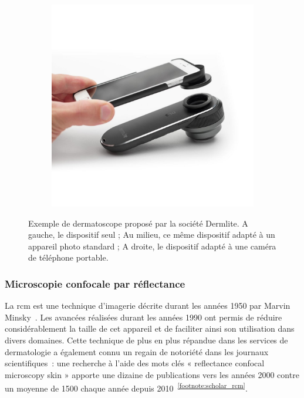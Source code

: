 \begin{figure}[H]
\begin{subfigure}{.32\textwidth}
    \end{subfigure}
    \begin{subfigure}{.32\textwidth}
      \centering
      \includegraphics[width=\linewidth]{contents/chapter_2/resources/example_device_dermlite_3.png}
    \end{subfigure}
    \caption{Exemple de dermatoscope proposé par la société Dermlite. A gauche, le dispositif seul ; Au milieu, ce même dispositif adapté à un appareil photo standard ; A droite, le dispositif adapté à une caméra de téléphone portable.}
    \label{fig:example_device_dermlite}
\end{figure}\par

\subsubsection{Microscopie confocale par réflectance}
La \acrfull{rcm} est une technique d’imagerie décrite durant les années 1950 par Marvin Minsky~\cite{Sheppard2019}. Les avancées réalisées durant les années 1990 ont permis de réduire considérablement la taille de cet appareil et de faciliter ainsi son utilisation dans divers domaines. Cette technique de plus en plus répandue dans les services de dermatologie a également connu un regain de notoriété dans les journaux scientifiques~: une recherche à l’aide des mots clés « reflectance confocal microscopy skin » apporte une dizaine de publications vers les années 2000 contre un moyenne de 1500 chaque année depuis 2010~\textsuperscript{\ref{footnote:scholar_rcm}}.\par

